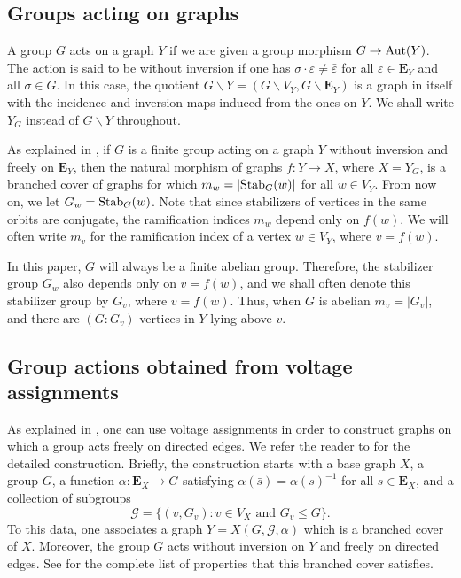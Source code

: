 \documentclass[11pt]{amsart}
\numberwithin{equation}{section}
\theoremstyle{remark}
\theoremstyle{definition}
\begin{document}
\subsection{Groups acting on graphs} \label{gr_act}
A group $G$ acts on a graph $Y$ if we are given a group morphism $G \rightarrow {\rm Aut}(Y)$.  The action is said to be without inversion if one has $\sigma \cdot \varepsilon \neq \bar{\varepsilon}$ for all $\varepsilon \in \mathbf{E}_{Y}$ and all $\sigma \in G$.  In this case, the quotient $G \backslash Y = (G \backslash V_{Y}, G \backslash \mathbf{E}_{Y})$ is a graph in itself with the incidence and inversion maps induced from the ones on $Y$.  We shall write $Y_{G}$ instead of $G \backslash Y$ throughout. 

As explained in \cite[Proposition 3.3]{Gambheera/Vallieres:2024}, if $G$ is a finite group acting on a graph $Y$ without inversion and freely on $\mathbf{E}_{Y}$, then the natural morphism of graphs $f: Y \rightarrow X$, where $X = Y_{G}$, is a branched cover of graphs for which $m_{w} = |{\rm Stab}_{G}(w)|$ for all $w \in V_{Y}$.  From now on, we let $G_{w} = {\rm Stab}_{G}(w)$.  Note that since stabilizers of vertices in the same orbits are conjugate, the ramification indices $m_{w}$ depend only on $f(w)$.  We will often write $m_{v}$ for the ramification index of a vertex $w \in V_{Y}$, where $v = f(w)$.  

In this paper, $G$ will always be a finite abelian group.  Therefore, the stabilizer group $G_{w}$ also depends only on $v = f(w)$, and we shall often denote this stabilizer group by $G_{v}$, where $v = f(w)$.  Thus, when $G$ is abelian $m_{v} = |G_{v}|$, and there are $(G:G_{v})$ vertices in $Y$ lying above $v$.

\subsection{Group actions obtained from voltage assignments} \label{volta}
As explained in \cite[\S 4.1]{Gambheera/Vallieres:2024}, one can use voltage assignments in order to construct graphs on which a group acts freely on directed edges.  We refer the reader to \cite[\S 4.1]{Gambheera/Vallieres:2024} for the detailed construction.  Briefly, the construction starts with a base graph $X$, a group $G$, a function $\alpha:\mathbf{E}_{X} \rightarrow G$ satisfying $\alpha(\bar{s}) = \alpha(s)^{-1}$ for all $s \in \mathbf{E}_{X}$, and a collection of subgroups 
$$\mathcal{G} = \{(v,G_{v}) : v \in V_{X} \text{ and } G_{v} \le G \}. $$
To this data, one associates a graph $Y = X(G,\mathcal{G},\alpha)$ which is a branched cover of $X$.  Moreover, the group $G$ acts without inversion on $Y$ and freely on directed edges.  See \cite[Proposition 4.1]{Gambheera/Vallieres:2024} for the complete list of properties that this branched cover satisfies.  
\end{document}
